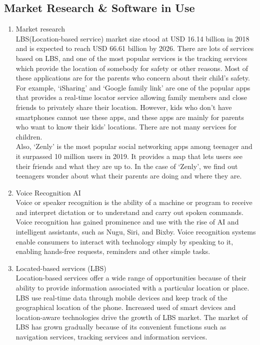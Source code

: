 \documentclass[conference]{IEEEtran}
\begin{document}
\subsection{Market Research \& Software in Use}
\begin{enumerate}
    \item Market research\\
    LBS(Location-based service) market size stood at USD 16.14 billion in 2018 and is expected to reach USD 66.61 billion by 2026. There are lots of services based on LBS, and one of the most popular services is the tracking services which provide the location of somebody for safety or other reasons. Most of these applications are for the parents who concern about their child’s safety. For example, ‘iSharing’ and ‘Google family link’ are one of the popular apps that provides a real-time locator service allowing family members and close friends to privately share their location. However, kids who don’t have smartphones cannot use these apps, and these apps are mainly for parents who want to know their kids’ locations. There are not many services for children.\\
    
    Also, ‘Zenly’ is the most popular social networking apps among teenager and it surpassed 10 million users in 2019. It provides a map that lets users see their friends and what they are up to. In the case of ‘Zenly’, we find out teenagers wonder about what their parents are doing and where they are.\\
    
    \item Voice Recognition AI\\
    Voice or speaker recognition is the ability of a machine or program to receive and interpret dictation or to understand and carry out spoken commands. Voice recognition has gained prominence and use with the rise of AI and intelligent assistants, such as Nugu, Siri, and Bixby. Voice recognition systems enable consumers to interact with technology simply by speaking to it, enabling hands-free requests, reminders and other simple tasks.\\
    \item Located-based services (LBS)\\
    Location-based services offer a wide range of opportunities because of their ability to provide information associated with a particular location or place. LBS use real-time data through mobile devices and keep track of the geographical location of the phone. Increased used of smart devices and location-aware technologies drive the growth of LBS market. The market of LBS has grown gradually because of its convenient functions such as navigation services, tracking services and information services. 
\end{enumerate}
\end{document}
